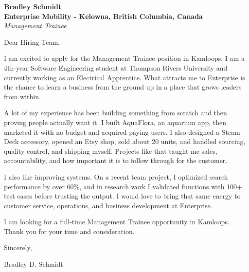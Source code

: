 \documentclass[11pt]{article}
\begin{document}
\textbf{Bradley Schmidt}\\
\vspace{0.5em}
\textbf{Enterprise Mobility - Kelowna, British Columbia, Canada}\\
\textit{Management Trainee}

Dear Hiring Team,

\par

I am excited to apply for the Management Trainee position in Kamloops. I am a 4th-year Software Engineering student at Thompson Rivers University and currently working as an Electrical Apprentice. What attracts me to Enterprise is the chance to learn a business from the ground up in a place that grows leaders from within.

\par

A lot of my experience has been building something from scratch and then proving people actually want it. I built AquaFlora, an aquarium app, then marketed it with no budget and acquired paying users. I also designed a Steam Deck accessory, opened an Etsy shop, sold about 20 units, and handled sourcing, quality control, and shipping myself. Projects like that taught me sales, accountability, and how important it is to follow through for the customer.

\par

I also like improving systems. On a recent team project, I optimized search performance by over 60\%, and in research work I validated functions with 100+ test cases before trusting the output. I would love to bring that same energy to customer service, operations, and business development at Enterprise.

\par

I am looking for a full-time Management Trainee opportunity in Kamloops. Thank you for your time and consideration.

\par

Sincerely,

\par

Bradley D. Schmidt
\end{document}
